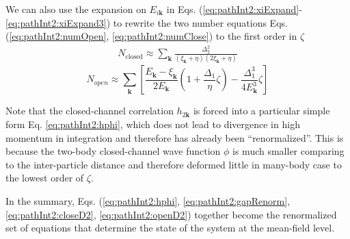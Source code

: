 \documentclass[reprint,pra]{revtex4-1}
\newcommand{\vk}{\ensuremath{\mathbf{k}}}
\newcommand{\mbr}[1]{\ensuremath{\left[#1\right]}}
\begin{document}
We can also use the expansion on $E_{i\vk}$ in Eqs. (\ref{eq:pathInt2:xiExpand}-\ref{eq:pathInt2:xiExpand3}) to rewrite the two number equations Eqs. (\ref{eq:pathInt2:numOpen}, \ref{eq:pathInt2:numClose}) to the first order in $\zeta$ 
\begin{gather}\label{eq:pathInt2:closeD2}
N_{\text{closed}}\approx\sum_{\vk}\frac{\Delta_{2}^2}{(\xi_{\vk}+\eta)(2\xi_{\vk}+\eta)}
\end{gather}
\begin{equation}\label{eq:pathInt2:openD2}
N_{open}\approx\sum_\vk\mbr{\frac{E_\vk-\xi_\vk}{2E_\vk}(1+\frac{\Delta_{1}}{\eta}\zeta)-\frac{\Delta_{1}^{3}}{4E_\vk^{3}}\zeta	}	
\end{equation}

Note that the closed-channel correlation $h_{2\vk}$ is forced into a particular simple form Eq. \ref{eq:pathInt2:hphi}, which does not lead to divergence in high momentum in integration and therefore has already been ``renormalized''.  This is  because the two-body closed-channel wave function $\phi$ is much smaller comparing to the inter-particle distance and therefore deformed little in many-body case to the lowest order  of $\zeta$. 

In the summary, Eqs. (\ref{eq:pathInt2:hphi}, \ref{eq:pathInt2:gapRenorm}, \ref{eq:pathInt2:closeD2}, \ref{eq:pathInt2:openD2}) together become the renormalized set of equations that determine the state of the system at the mean-field level. 
\end{document}
